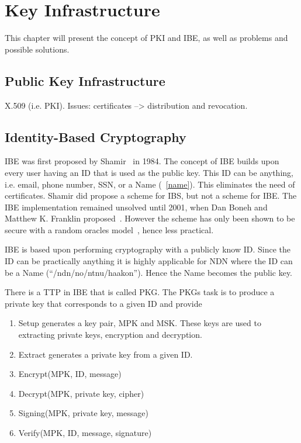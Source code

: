 \chapter{Key Infrastructure}
This chapter will present the concept of \gls{PKI} and \gls{IBE}, as well as problems and possible solutions. 

\section{Public Key Infrastructure}

X.509 (i.e. \gls{PKI}). Issues: certificates --> distribution and revocation.

\section{Identity-Based Cryptography}\label{ibc}
\gls{IBE} was first proposed by Shamir~\cite{DBLP:conf/crypto/Shamir84} in 1984. 
The concept of \gls{IBE} builds upon every user having an \gls{ID} that is used as the public key. 
This \gls{ID} can be anything, i.e. email, phone number, \gls{SSN}, or a Name (~\autoref{name}).
This eliminates the need of certificates.
Shamir did propose a scheme for \gls{IBS}, but not a scheme for \gls{IBE}. 
The \gls{IBE} implementation remained unsolved until 2001, when Dan Boneh and Matthew K. Franklin proposed~\cite{DBLP:conf/crypto/BonehF01}.
However the scheme has only been shown to be secure with a random oracles model~\cite{DBLP:journals/iacr/Waters04}, hence less practical.


\gls{IBE} is based upon performing cryptography with a publicly know \gls{ID}.
Since the \gls{ID} can be practically anything it is highly applicable for \gls{NDN} where the \gls{ID} can be a Name (``/ndn/no/ntnu/haakon'').
Hence the Name becomes the public key. 

There is a \gls{TTP} in \gls{IBE} that is called \gls{PKG}.
The \gls{PKG}s task is to produce a private key that corresponds to a given ID and provide 

\begin{enumerate}
  \item Setup generates a key pair, \gls{MPK} and \gls{MSK}. These keys are used to extracting private keys, encryption and decryption.
  \item Extract generates a private key from a given ID. 
  \item Encrypt(\gls{MPK}, ID, message)
  \item Decrypt(\gls{MPK}, private key, cipher)
  \item Signing(\gls{MPK}, private key, message)
  \item Verify(\gls{MPK}, ID, message, signature)
\end{enumerate}

